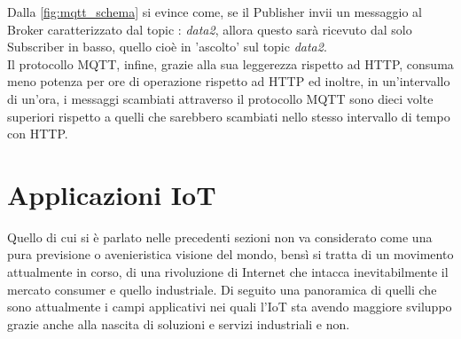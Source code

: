 Dalla \autoref{fig:mqtt_schema} si evince come, se il Publisher invii un messaggio al Broker caratterizzato dal topic : \textit{data2}, allora questo sarà ricevuto dal solo Subscriber in  basso, quello cioè in 'ascolto' sul topic \textit{data2}.\\
Il protocollo MQTT, infine, grazie alla sua leggerezza rispetto ad HTTP, consuma meno potenza per ore di operazione rispetto ad HTTP ed inoltre, in un'intervallo di un'ora, i messaggi scambiati attraverso il protocollo MQTT sono dieci volte superiori rispetto a quelli che sarebbero scambiati nello stesso intervallo di tempo con HTTP.\cite{famous:paper_mqtt_energy} \cite{famous:paper_mqtt_qos}


\section{Applicazioni IoT}
Quello di cui si è parlato nelle precedenti sezioni non va considerato come una pura previsione o avenieristica visione del mondo, bensì si tratta di un movimento attualmente in corso, di una rivoluzione di Internet che intacca inevitabilmente il mercato consumer e quello industriale. 
Di seguito una panoramica di quelli che sono attualmente i campi applicativi nei quali l'IoT sta avendo maggiore sviluppo grazie anche alla nascita di soluzioni e servizi industriali e non.
